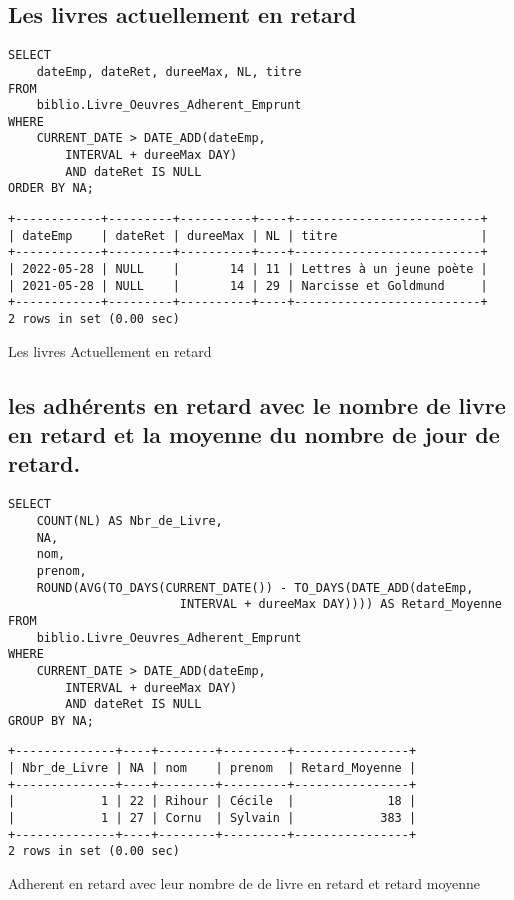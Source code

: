 \documentclass{article}
\begin{document}
\subsection{Les livres actuellement en retard}
\begin{center}
\begin{minipage}{0.75\linewidth}
\begin{listing}[H]
\begin{verbatim}
SELECT 
    dateEmp, dateRet, dureeMax, NL, titre
FROM
    biblio.Livre_Oeuvres_Adherent_Emprunt
WHERE
    CURRENT_DATE > DATE_ADD(dateEmp,
        INTERVAL + dureeMax DAY)
        AND dateRet IS NULL
ORDER BY NA;
\end{verbatim}
\begin{verbatim}
+------------+---------+----------+----+--------------------------+
| dateEmp    | dateRet | dureeMax | NL | titre                    |
+------------+---------+----------+----+--------------------------+
| 2022-05-28 | NULL    |       14 | 11 | Lettres à un jeune poète |
| 2021-05-28 | NULL    |       14 | 29 | Narcisse et Goldmund     |
+------------+---------+----------+----+--------------------------+
2 rows in set (0.00 sec)
\end{verbatim}
\caption{Les livres Actuellement en retard}
\end{listing}
\end{minipage}
\end{center}

\subsection{les adhérents en retard avec le nombre de livre en retard et la moyenne du nombre de jour de retard.}
\begin{center}
\begin{minipage}{0.8\linewidth}
\begin{listing}[H]
\begin{verbatim}
SELECT 
    COUNT(NL) AS Nbr_de_Livre,
    NA,
    nom,
    prenom,
    ROUND(AVG(TO_DAYS(CURRENT_DATE()) - TO_DAYS(DATE_ADD(dateEmp,
                        INTERVAL + dureeMax DAY)))) AS Retard_Moyenne
FROM
    biblio.Livre_Oeuvres_Adherent_Emprunt
WHERE
    CURRENT_DATE > DATE_ADD(dateEmp,
        INTERVAL + dureeMax DAY)
        AND dateRet IS NULL
GROUP BY NA;
\end{verbatim}
\begin{verbatim}
+--------------+----+--------+---------+----------------+
| Nbr_de_Livre | NA | nom    | prenom  | Retard_Moyenne |
+--------------+----+--------+---------+----------------+
|            1 | 22 | Rihour | Cécile  |             18 |
|            1 | 27 | Cornu  | Sylvain |            383 |
+--------------+----+--------+---------+----------------+
2 rows in set (0.00 sec)
\end{verbatim}
\caption{Adherent en retard avec leur nombre de de livre en retard et retard moyenne}
\end{listing}
\end{minipage}
\end{center}
\end{document}
